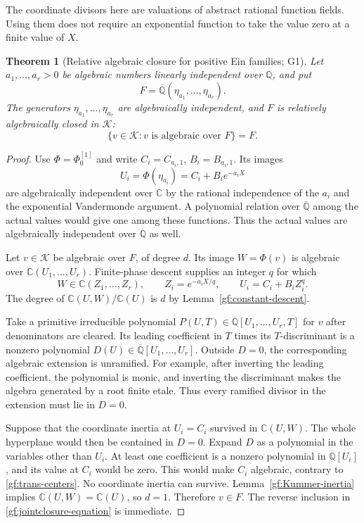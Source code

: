 \documentclass[11pt,a4paper]{article}
\numberwithin{equation}{section}
\newtheorem{theorem}{Theorem}[section]
\theoremstyle{definition}
\theoremstyle{remark}
\newcommand{\A}{\overline{\mathbb Q}}
\newcommand{\K}{\mathcal K}
\begin{document}
The coordinate divisors here are valuations of abstract rational
function fields.  Using them does not require an exponential function
to take the value zero at a finite value of $X$.

\begin{theorem}[Relative algebraic closure for positive Ein families;
G1]\label{gf:jointclosure}
Let $a_1,\ldots,a_r>0$ be algebraic numbers linearly independent over
$\mathbb Q$, and put
\[
 F=\A(\eta_{a_1},\ldots,\eta_{a_r}).
\]
The generators $\eta_{a_1},\ldots,\eta_{a_r}$ are algebraically
independent, and $F$ is relatively algebraically closed in $\K$:
\begin{equation}\label{gf:jointclosure-equation}
 \{v\in\K:v\text{ is algebraic over }F\}=F.
\end{equation}
\end{theorem}
\begin{proof}
Use $\Phi=\Phi_0^{[1]}$ and write
$C_i=C_{a_i,1}$, $B_i=B_{a_i,1}$.  Its images
\[
 U_i=\Phi(\eta_{a_i})=C_i+B_ie^{-a_iX}
\]
are algebraically independent over $\mathbb C$ by the rational
independence of the $a_i$ and the exponential Vandermonde argument.
A polynomial relation over $\A$ among the actual values would give
one among these functions.  Thus the actual values are algebraically
independent over $\A$ as well.

Let $v\in\K$ be algebraic over $F$, of degree $d$.  Its image
$W=\Phi(v)$ is algebraic over $\mathbb C(U_1,\ldots,U_r)$.
Finite-phase descent supplies an integer $q$ for which
\[
 W\in\mathbb C(Z_1,\ldots,Z_r),\qquad
 Z_i=e^{-a_iX/q},\qquad U_i=C_i+B_iZ_i^q.
\]
The degree of $\mathbb C(U,W)/\mathbb C(U)$ is $d$ by
Lemma~\ref{gf:constant-descent}.

Take a primitive irreducible polynomial
$P(U,T)\in\A[U_1,\ldots,U_r,T]$ for $v$ after denominators are cleared.
Its leading coefficient in $T$ times its $T$-discriminant is a nonzero
polynomial $D(U)\in\A[U_1,\ldots,U_r]$.  Outside $D=0$, the
corresponding algebraic extension is unramified.  For example, after
inverting the leading coefficient, the polynomial is monic, and
inverting the discriminant makes the algebra generated by a root
finite etale.  Thus every ramified divisor in the extension must lie
in $D=0$.

Suppose that the coordinate inertia at $U_i=C_i$ survived in
$\mathbb C(U,W)$.  The whole hyperplane would then be contained in
$D=0$.  Expand $D$ as a polynomial in the variables other than $U_i$.
At least one coefficient is a nonzero polynomial in $\A[U_i]$,
and its value at $C_i$ would be zero.  This would make $C_i$ algebraic,
contrary to \eqref{gf:trans-centers}.  No coordinate inertia can
survive.  Lemma~\ref{gf:Kummer-inertia} implies
$\mathbb C(U,W)=\mathbb C(U)$, so $d=1$.  Therefore $v\in F$.
The reverse inclusion in \eqref{gf:jointclosure-equation} is immediate.
\end{proof}
\end{document}
